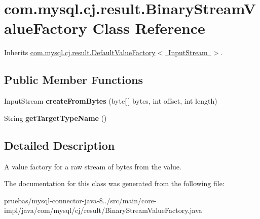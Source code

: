 \hypertarget{classcom_1_1mysql_1_1cj_1_1result_1_1_binary_stream_value_factory}{}\section{com.\+mysql.\+cj.\+result.\+Binary\+Stream\+Value\+Factory Class Reference}
\label{classcom_1_1mysql_1_1cj_1_1result_1_1_binary_stream_value_factory}


Inherits \mbox{\hyperlink{classcom_1_1mysql_1_1cj_1_1result_1_1_default_value_factory}{com.\+mysql.\+cj.\+result.\+Default\+Value\+Factory$<$ Input\+Stream $>$}}.

\subsection*{Public Member Functions}
\begin{DoxyCompactItemize}
\item 
\mbox{\label{classcom_1_1mysql_1_1cj_1_1result_1_1_binary_stream_value_factory_a5ef15898b03e5e381e03b3da41bd2e0e}} 
Input\+Stream {\bfseries create\+From\+Bytes} (byte\mbox{[}$\,$\mbox{]} bytes, int offset, int length)
\item 
\mbox{\label{classcom_1_1mysql_1_1cj_1_1result_1_1_binary_stream_value_factory_ae2de7b6e71fef5a012d3463964c78ffb}} 
String {\bfseries get\+Target\+Type\+Name} ()
\end{DoxyCompactItemize}


\subsection{Detailed Description}
A value factory for a raw stream of bytes from the value. 

The documentation for this class was generated from the following file\+:\begin{DoxyCompactItemize}
\item 
pruebas/mysql-\/connector-\/java-\/8../src/main/core-\/impl/java/com/mysql/cj/result/Binary\+Stream\+Value\+Factory.\+java\end{DoxyCompactItemize}
